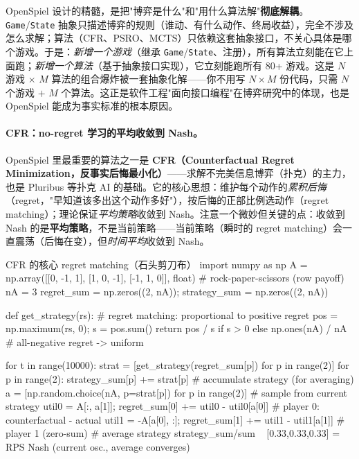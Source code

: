 \begin{insight}[统一抽象 $=$ "博弈"与"算法"解耦]
OpenSpiel 设计的精髓，是把"博弈是什么"和"用什么算法解"\textbf{彻底解耦}。\texttt{Game}/\texttt{State} 抽象只描述博弈的规则（谁动、有什么动作、终局收益），完全不涉及怎么求解；算法（CFR、PSRO、MCTS）只依赖这套抽象接口，不关心具体是哪个游戏。于是：\emph{新增一个游戏}（继承 \texttt{Game}/\texttt{State}、注册），所有算法立刻能在它上面跑；\emph{新增一个算法}（基于抽象接口实现），它立刻能跑所有 80+ 游戏。这是 $N$ 游戏 $\times$ $M$ 算法的组合爆炸被一套抽象化解——你不用写 $N\times M$ 份代码，只需 $N$ 个游戏 $+$ $M$ 个算法。这正是软件工程"面向接口编程"在博弈研究中的体现，也是 OpenSpiel 能成为事实标准的根本原因。
\end{insight}

\paragraph{CFR：no-regret 学习的平均收敛到 Nash。}
OpenSpiel 里最重要的算法之一是 \textbf{CFR（Counterfactual Regret Minimization，反事实后悔最小化）}\cite{zinkevich2008cfr}——求解不完美信息博弈（扑克）的主力，也是 Pluribus 等扑克 AI 的基础。它的核心思想：维护每个动作的\emph{累积后悔}（regret，"早知道该多出这个动作多好"），按后悔的正部比例选动作（regret matching）；理论保证\emph{平均策略}收敛到 Nash。注意一个微妙但关键的点：收敛到 Nash 的是\textbf{平均策略}，不是当前策略——当前策略（瞬时的 regret matching）会一直震荡（后悔在变），但\emph{时间平均}收敛到 Nash。

\begin{codebox}[Python]{CFR 的核心 regret matching（石头剪刀布）}
import numpy as np
A = np.array([[0, -1, 1], [1, 0, -1], [-1, 1, 0]], float)   # rock-paper-scissors (row payoff)
nA = 3
regret_sum = np.zeros((2, nA)); strategy_sum = np.zeros((2, nA))

def get_strategy(rs):                                # regret matching: proportional to positive regret
    pos = np.maximum(rs, 0); s = pos.sum()
    return pos / s if s > 0 else np.ones(nA) / nA    # all-negative regret -> uniform

for t in range(10000):
    strat = [get_strategy(regret_sum[p]) for p in range(2)]
    for p in range(2):
        strategy_sum[p] += strat[p]                  # accumulate strategy (for averaging)
    a = [np.random.choice(nA, p=strat[p]) for p in range(2)]   # sample from current strategy
    util0 = A[:, a[1]]; regret_sum[0] += util0 - util0[a[0]]   # player 0: counterfactual - actual
    util1 = -A[a[0], :]; regret_sum[1] += util1 - util1[a[1]]  # player 1 (zero-sum)
# average strategy strategy_sum/sum ~ [0.33,0.33,0.33] = RPS Nash (current osc., average converges)
\end{codebox}

